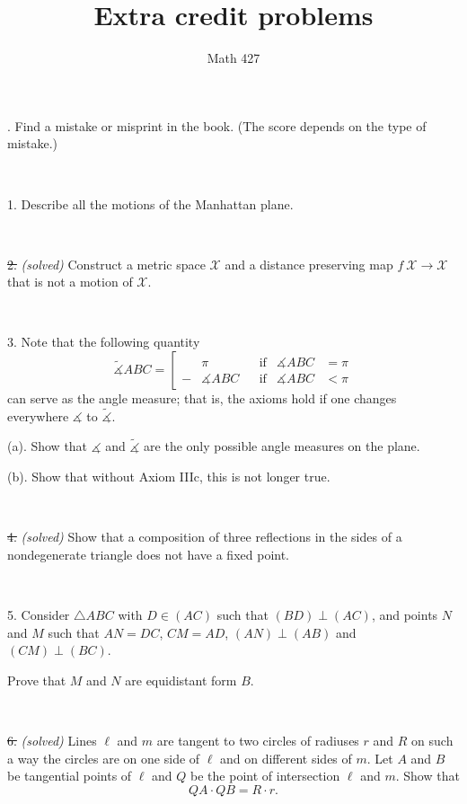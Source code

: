 \documentclass[oneside,a4paper]{article}
\begin{document}
\title{Extra credit problems}
\author{Math 427}
\date{}
\maketitle


. Find a mistake or misprint in the book.
(The score depends on the type of mistake.)

\ 

\noi %
{1.} Describe all the motions of the Manhattan plane.

\ 

\noi \sout{2.} \textit{(solved)}
Construct a metric space $\mathcal X$ and a distance preserving map $f\:\mathcal X\to \mathcal X$ that is not a motion of $\mathcal X$.

\ 

\noi %
{3.} Note that the following quantity 
$$\tilde
\measuredangle ABC=\left[
\begin{aligned}
&\pi&&\text{if}&\measuredangle ABC&=\pi
\\
-&\measuredangle ABC&&\text{if}&\measuredangle ABC&<\pi
\end{aligned}
\right.$$
can serve as the angle measure; 
that is, the axioms hold if one changes everywhere $\measuredangle$ to $\tilde\measuredangle$.

\noi (a). Show that $\measuredangle$ and $\tilde\measuredangle$ are the only possible angle measures on the plane. 

\noi (b). Show that without Axiom IIIc, this is not longer true.


\ 

\noi \sout
{4.} \textit{(solved)}
Show that a composition of three reflections in the sides of a nondegenerate triangle does not have a fixed point.

\ 

\noi %
{5.} %
Consider $\triangle A B C$ with $D\in (A C)$ such that $(BD)\perp (AC)$, and points $N$ and $M$ such that $AN=DC$, $CM=AD$, $(AN)\perp(AB)$ and $(CM)\perp(BC)$.

Prove that $M$ and $N$ are equidistant form $B$.

\ 

\noi \sout
{6.} \textit{(solved)} 
Lines $\ell$ and $m$ are tangent to two circles of radiuses $r$ and $R$ on such
a way the circles are on one side of $\ell$ and on different sides of $m$. 
Let $A$ and $B$ be
tangential points of $\ell$ and $Q$ be the point of intersection $\ell$ and $m$. 
Show that
$$QA\cdot QB = R\cdot r.$$
\end{document}
